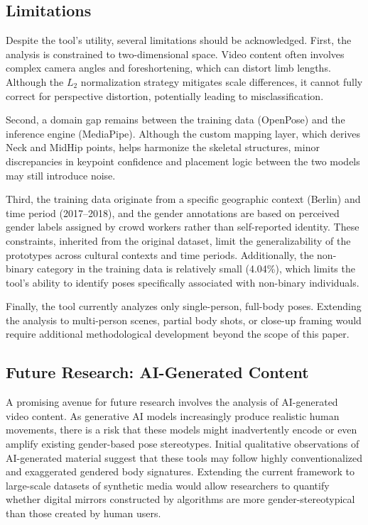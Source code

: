 \documentclass[12pt, a4paper]{article}
\begin{document}
\subsection{Limitations}
\label{sec:limitations}

Despite the tool's utility, several limitations should be acknowledged. First, the analysis is constrained to two-dimensional space. Video content often involves complex camera angles and foreshortening, which can distort limb lengths. Although the $L_2$ normalization strategy mitigates scale differences, it cannot fully correct for perspective distortion, potentially leading to misclassification.

Second, a domain gap remains between the training data (OpenPose) and the inference engine (MediaPipe). Although the custom mapping layer, which derives Neck and MidHip points, helps harmonize the skeletal structures, minor discrepancies in keypoint confidence and placement logic between the two models may still introduce noise.

Third, the training data originate from a specific geographic context (Berlin) and time period (2017--2018), and the gender annotations are based on perceived gender labels assigned by crowd workers rather than self-reported identity. These constraints, inherited from the original \citet{tsolak2025unveiling} dataset, limit the generalizability of the prototypes across cultural contexts and time periods. Additionally, the non-binary category in the training data is relatively small (4.04\%), which limits the tool's ability to identify poses specifically associated with non-binary individuals.

Finally, the tool currently analyzes only single-person, full-body poses. Extending the analysis to multi-person scenes, partial body shots, or close-up framing would require additional methodological development beyond the scope of this paper.


\subsection{Future Research: AI-Generated Content}
\label{sec:future_work}

A promising avenue for future research involves the analysis of AI-generated video content. As generative AI models increasingly produce realistic human movements, there is a risk that these models might inadvertently encode or even amplify existing gender-based pose stereotypes. Initial qualitative observations of AI-generated material suggest that these tools may follow highly conventionalized and exaggerated gendered body signatures. Extending the current framework to large-scale datasets of synthetic media would allow researchers to quantify whether digital mirrors constructed by algorithms are more gender-stereotypical than those created by human users.
\end{document}
